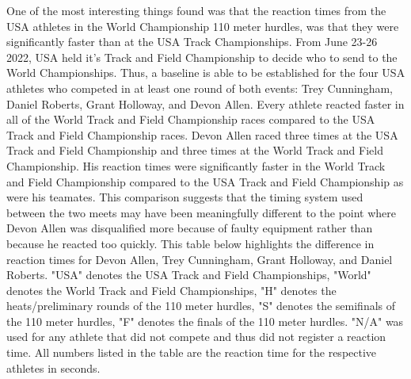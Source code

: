 \documentclass[12pt, letterpaper, titlepage]{article}
\begin{document}
One of the most interesting things found was that the reaction times from the USA
athletes in the World Championship 110 meter hurdles, was that they were significantly
faster than at the USA Track Championships.  From June 23-26 2022, USA held it's Track
and Field Championship to decide who to send to the World Championships.  Thus, a baseline
is able to be established for the four USA athletes who competed in at least one round
of both events: Trey Cunningham, Daniel Roberts, Grant Holloway, and Devon Allen. Every
athlete reacted faster in all of the World Track and Field Championship races compared
to the USA Track and Field Championship races. Devon Allen raced three times at
the USA Track and Field Championship and three times at the World Track and Field 
Championship.  His reaction times were significantly faster in the World Track and
Field Championship compared to the USA Track and Field Championship as were his
teamates.  This comparison suggests that the timing system used between the two
meets may have been meaningfully different to the point where Devon Allen was
disqualified more because of faulty equipment rather than because he reacted
too quickly.  This table below highlights the difference in reaction times for
Devon Allen, Trey Cunningham, Grant Holloway, and Daniel Roberts. "USA" denotes
the USA Track and Field Championships, "World" denotes the World Track and Field
Championships, "H" denotes the heats/preliminary rounds of the 110 meter hurdles,
"S" denotes the semifinals of the 110 meter hurdles, "F" denotes the finals of the
110 meter hurdles.  "N/A" was used for any athlete that did not compete and thus
did not register a reaction time.  All numbers listed in the table are the reaction
time for the respective athletes in seconds.

  
\end{document}
